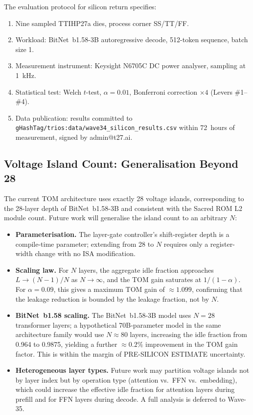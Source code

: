 The evaluation protocol for silicon return specifies:
\begin{enumerate}
  \item Nine sampled TTIHP27a dies, process corner SS/TT/FF.
  \item Workload: BitNet~b1.58-3B \cite{bitnet_b158_2024} autoregressive
    decode, 512-token sequence, batch size 1.
  \item Measurement instrument: Keysight N6705C DC power analyser,
    sampling at 1~kHz.
  \item Statistical test: Welch \(t\)-test, \(\alpha = 0.01\),
    Bonferroni correction \(\times 4\) (Levers \#1--\#4).
  \item Data publication: results committed to
    \texttt{gHashTag/trios:data/wave34\_silicon\_results.csv} within
    72~hours of measurement, signed by admin@t27.ai.
\end{enumerate}

\subsection{Voltage Island Count: Generalisation Beyond 28}

The current TOM architecture uses exactly 28 voltage islands,
corresponding to the 28-layer depth of BitNet~b1.58-3B
\cite{bitnet_b158_2024} and consistent with the Sacred ROM L2 module count.
Future work will generalise the island count to an arbitrary \(N\):

\begin{itemize}
  \item \textbf{Parameterisation.}  The layer-gate controller's shift-register
    depth is a compile-time parameter; extending from 28 to \(N\) requires
    only a register-width change with no ISA modification.

  \item \textbf{Scaling law.}  For \(N\) layers, the aggregate idle fraction
    approaches \(L \to (N-1)/N\) as \(N \to \infty\), and the TOM gain
    saturates at \(1/(1 - \alpha)\).  For \(\alpha = 0.09\), this gives a
    maximum TOM gain of \(\approx 1.099\), confirming that the leakage
    reduction is bounded by the leakage fraction, not by \(N\).

  \item \textbf{BitNet~b1.58 scaling.}  The BitNet~b1.58-3B model uses
    \(N = 28\) transformer layers; a hypothetical 70B-parameter model in the
    same architecture family would use \(N \approx 80\) layers, increasing
    the idle fraction from 0.964 to 0.9875, yielding a further
    \(\approx 0.2\%\) improvement in the TOM gain factor.  This is within
    the margin of PRE-SILICON ESTIMATE uncertainty.

  \item \textbf{Heterogeneous layer types.}  Future work may partition
    voltage islands not by layer index but by operation type
    (attention vs.\ FFN vs.\ embedding), which could increase the effective
    idle fraction for attention layers during prefill and for FFN layers
    during decode.  A full analysis is deferred to Wave-35.
\end{itemize}


